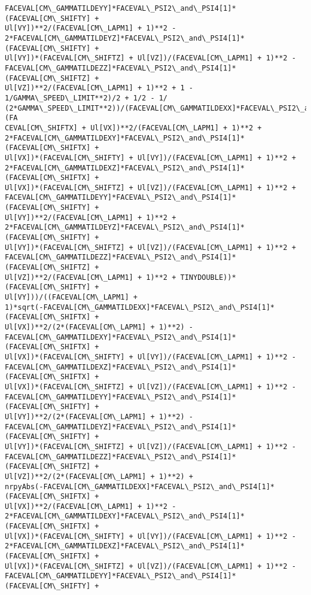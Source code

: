 \documentclass[landscape,letterpaper,10pt,english]{article}
\begin{document}
\begin{Verbatim}[commandchars=\\\{\}]
FACEVAL[CM\_GAMMATILDEYY]*FACEVAL\_PSI2\_and\_PSI4[1]*(FACEVAL[CM\_SHIFTY] +
Ul[VY])**2/(FACEVAL[CM\_LAPM1] + 1)**2 -
2*FACEVAL[CM\_GAMMATILDEYZ]*FACEVAL\_PSI2\_and\_PSI4[1]*(FACEVAL[CM\_SHIFTY] +
Ul[VY])*(FACEVAL[CM\_SHIFTZ] + Ul[VZ])/(FACEVAL[CM\_LAPM1] + 1)**2 -
FACEVAL[CM\_GAMMATILDEZZ]*FACEVAL\_PSI2\_and\_PSI4[1]*(FACEVAL[CM\_SHIFTZ] +
Ul[VZ])**2/(FACEVAL[CM\_LAPM1] + 1)**2 + 1 - 1/GAMMA\_SPEED\_LIMIT**2)/2 + 1/2 - 1/
(2*GAMMA\_SPEED\_LIMIT**2))/(FACEVAL[CM\_GAMMATILDEXX]*FACEVAL\_PSI2\_and\_PSI4[1]*(FA
CEVAL[CM\_SHIFTX] + Ul[VX])**2/(FACEVAL[CM\_LAPM1] + 1)**2 +
2*FACEVAL[CM\_GAMMATILDEXY]*FACEVAL\_PSI2\_and\_PSI4[1]*(FACEVAL[CM\_SHIFTX] +
Ul[VX])*(FACEVAL[CM\_SHIFTY] + Ul[VY])/(FACEVAL[CM\_LAPM1] + 1)**2 +
2*FACEVAL[CM\_GAMMATILDEXZ]*FACEVAL\_PSI2\_and\_PSI4[1]*(FACEVAL[CM\_SHIFTX] +
Ul[VX])*(FACEVAL[CM\_SHIFTZ] + Ul[VZ])/(FACEVAL[CM\_LAPM1] + 1)**2 +
FACEVAL[CM\_GAMMATILDEYY]*FACEVAL\_PSI2\_and\_PSI4[1]*(FACEVAL[CM\_SHIFTY] +
Ul[VY])**2/(FACEVAL[CM\_LAPM1] + 1)**2 +
2*FACEVAL[CM\_GAMMATILDEYZ]*FACEVAL\_PSI2\_and\_PSI4[1]*(FACEVAL[CM\_SHIFTY] +
Ul[VY])*(FACEVAL[CM\_SHIFTZ] + Ul[VZ])/(FACEVAL[CM\_LAPM1] + 1)**2 +
FACEVAL[CM\_GAMMATILDEZZ]*FACEVAL\_PSI2\_and\_PSI4[1]*(FACEVAL[CM\_SHIFTZ] +
Ul[VZ])**2/(FACEVAL[CM\_LAPM1] + 1)**2 + TINYDOUBLE))*(FACEVAL[CM\_SHIFTY] +
Ul[VY]))/((FACEVAL[CM\_LAPM1] +
1)*sqrt(-FACEVAL[CM\_GAMMATILDEXX]*FACEVAL\_PSI2\_and\_PSI4[1]*(FACEVAL[CM\_SHIFTX] +
Ul[VX])**2/(2*(FACEVAL[CM\_LAPM1] + 1)**2) -
FACEVAL[CM\_GAMMATILDEXY]*FACEVAL\_PSI2\_and\_PSI4[1]*(FACEVAL[CM\_SHIFTX] +
Ul[VX])*(FACEVAL[CM\_SHIFTY] + Ul[VY])/(FACEVAL[CM\_LAPM1] + 1)**2 -
FACEVAL[CM\_GAMMATILDEXZ]*FACEVAL\_PSI2\_and\_PSI4[1]*(FACEVAL[CM\_SHIFTX] +
Ul[VX])*(FACEVAL[CM\_SHIFTZ] + Ul[VZ])/(FACEVAL[CM\_LAPM1] + 1)**2 -
FACEVAL[CM\_GAMMATILDEYY]*FACEVAL\_PSI2\_and\_PSI4[1]*(FACEVAL[CM\_SHIFTY] +
Ul[VY])**2/(2*(FACEVAL[CM\_LAPM1] + 1)**2) -
FACEVAL[CM\_GAMMATILDEYZ]*FACEVAL\_PSI2\_and\_PSI4[1]*(FACEVAL[CM\_SHIFTY] +
Ul[VY])*(FACEVAL[CM\_SHIFTZ] + Ul[VZ])/(FACEVAL[CM\_LAPM1] + 1)**2 -
FACEVAL[CM\_GAMMATILDEZZ]*FACEVAL\_PSI2\_and\_PSI4[1]*(FACEVAL[CM\_SHIFTZ] +
Ul[VZ])**2/(2*(FACEVAL[CM\_LAPM1] + 1)**2) +
nrpyAbs(-FACEVAL[CM\_GAMMATILDEXX]*FACEVAL\_PSI2\_and\_PSI4[1]*(FACEVAL[CM\_SHIFTX] +
Ul[VX])**2/(FACEVAL[CM\_LAPM1] + 1)**2 -
2*FACEVAL[CM\_GAMMATILDEXY]*FACEVAL\_PSI2\_and\_PSI4[1]*(FACEVAL[CM\_SHIFTX] +
Ul[VX])*(FACEVAL[CM\_SHIFTY] + Ul[VY])/(FACEVAL[CM\_LAPM1] + 1)**2 -
2*FACEVAL[CM\_GAMMATILDEXZ]*FACEVAL\_PSI2\_and\_PSI4[1]*(FACEVAL[CM\_SHIFTX] +
Ul[VX])*(FACEVAL[CM\_SHIFTZ] + Ul[VZ])/(FACEVAL[CM\_LAPM1] + 1)**2 -
FACEVAL[CM\_GAMMATILDEYY]*FACEVAL\_PSI2\_and\_PSI4[1]*(FACEVAL[CM\_SHIFTY] +

\end{Verbatim}
\end{document}
